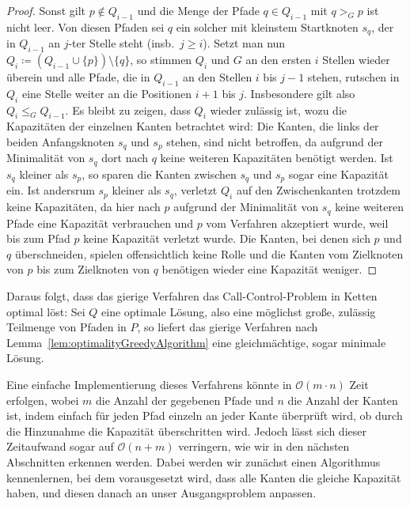 \begin{proof}
    Sonst gilt $p \notin Q_{i-1}$ und die Menge der Pfade $q \in Q_{i-1}$ mit $q >_G p$ ist nicht leer.
    Von diesen Pfaden sei $q$ ein solcher mit kleinstem Startknoten $s_q$, der in $Q_{i-1}$ an $j$-ter Stelle steht
    (insb.\ $j \geq i$).
    Setzt man nun $Q_{i} \coloneqq (Q_{i-1} \cup \{ p \}) \setminus \{ q \} $, so stimmen $Q_{i}$ und $G$ an den
    ersten $i$ Stellen wieder überein und alle Pfade, die in $Q_{i-1}$ an den Stellen $i$ bis $j-1$ stehen, rutschen
    in $Q_i$ eine Stelle weiter an die Positionen $i+1$ bis $j$.
    Insbesondere gilt also $Q_i \leq_G Q_{i-1}$.
    Es bleibt zu zeigen, dass $Q_i$ wieder zulässig ist, wozu die Kapazitäten der einzelnen Kanten betrachtet wird:
    Die Kanten, die links der beiden Anfangsknoten $s_q$ und $s_p$ stehen, sind nicht betroffen, da aufgrund der Minimalität
    von $s_q$ dort nach $q$ keine weiteren Kapazitäten benötigt werden.
    Ist $s_q$ kleiner als $s_p$, so sparen die Kanten zwischen $s_q$ und $s_p$ sogar eine Kapazität ein.
    Ist andersrum $s_p$ kleiner als $s_q$, verletzt $Q_i$ auf den Zwischenkanten trotzdem keine Kapazitäten, da
    hier nach $p$ aufgrund der Minimalität von $s_q$ keine weiteren Pfade eine Kapazität verbrauchen und $p$ vom
    Verfahren akzeptiert wurde, weil bis zum Pfad $p$ keine Kapazität verletzt wurde.
    Die Kanten, bei denen sich $p$ und $q$ überschneiden, spielen offensichtlich keine Rolle und die Kanten
    vom Zielknoten von $p$ bis zum Zielknoten von $q$ benötigen wieder eine Kapazität weniger.
\end{proof}

Daraus folgt, dass das gierige Verfahren das Call-Control-Problem in Ketten optimal löst:
Sei $Q$ eine optimale Lösung, also eine möglichst große, zulässig Teilmenge von Pfaden in $P$, so liefert das gierige
Verfahren nach Lemma~\ref{lem:optimalityGreedyAlgorithm} eine gleichmächtige, sogar minimale Lösung.

Eine einfache Implementierung dieses Verfahrens könnte in $\mathcal O(m \cdot n)$ Zeit erfolgen, wobei $m$ die Anzahl der gegebenen
Pfade und $n$ die Anzahl der Kanten ist, indem einfach für jeden Pfad einzeln an jeder Kante überprüft wird, ob durch
die Hinzunahme die Kapazität überschritten wird.
Jedoch lässt sich dieser Zeitaufwand sogar auf $\mathcal O(n+m)$ verringern, wie wir in den nächsten Abschnitten erkennen werden.
Dabei werden wir zunächst einen Algorithmus kennenlernen, bei dem vorausgesetzt wird, dass alle Kanten die gleiche
Kapazität haben, und diesen danach an unser Ausgangsproblem anpassen.

